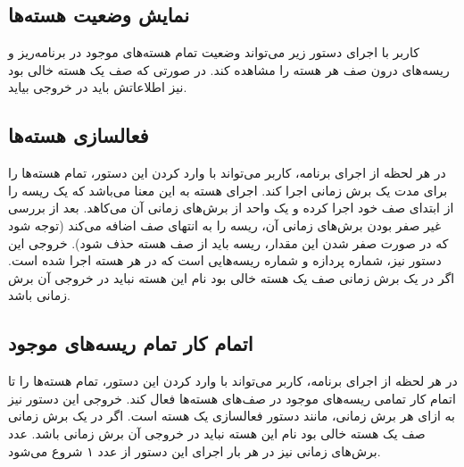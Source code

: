 \documentclass{utap}
\begin{document}
	\subsection{نمایش وضعیت هسته‌ها}
	\hspace{5mm}
	کاربر با اجرای دستور زیر می‌تواند وضعیت تمام هسته‌های موجود در برنامه‌ریز و ریسه‌های درون صف هر هسته را مشاهده کند. در صورتی که صف یک هسته‌ خالی بود نیز اطلاعاتش باید در خروجی بیاید.
	
	\linespread{1.6}
	\begin{latin}%
		\centering
		\begin{minipage}[t]{1\textwidth}
			{}
			{}
			{}
		\end{minipage}%
	\end{latin}

	\subsection{فعالسازی هسته‌ها}
	\hspace{5mm}
	در هر لحظه از اجرای برنامه، کاربر می‌تواند با وارد کردن این دستور، تمام هسته‌ها را برای مدت یک برش زمانی اجرا کند. اجرای هسته به این معنا می‌باشد که یک ریسه‌ را از ابتدای صف خود  اجرا کرده و یک واحد از برش‌های زمانی آن می‌کاهد. بعد از بررسی غیر صفر بودن برش‌های زمانی آن، ریسه را به انتهای صف اضافه می‌کند (توجه شود که در صورت صفر شدن این مقدار،‌ ریسه باید از صف هسته حذف شود).
	خروجی این دستور نیز، شماره پردازه و شماره ریسه‌هایی است که در هر هسته اجرا شده است. اگر در یک برش زمانی صف یک هسته خالی بود نام این هسته نباید در خروجی آن برش زمانی باشد.
	
	\linespread{1.6}
	\begin{latin}%
		\centering
		\begin{minipage}[t]{1\textwidth}
			{}
			{}
			{}
		\end{minipage}%
	\end{latin}

	\subsection{اتمام کار تمام ریسه‌های موجود}
	\hspace{5mm}
	در هر لحظه از اجرای برنامه، کاربر می‌تواند با وارد کردن این دستور، تمام هسته‌ها را تا اتمام کار تمامی ریسه‌های موجود در صف‌ها‌ی هسته‌ها فعال کند.
	خروجی این دستور نیز به ازای هر برش زمانی، مانند دستور فعالسازی یک هسته است. اگر در یک برش زمانی صف یک هسته خالی بود نام این هسته نباید در خروجی آن برش زمانی باشد. عدد برش‌های زمانی نیز در هر بار اجرای این دستور از عدد ۱ شروع می‌شود.
	
\end{document}
